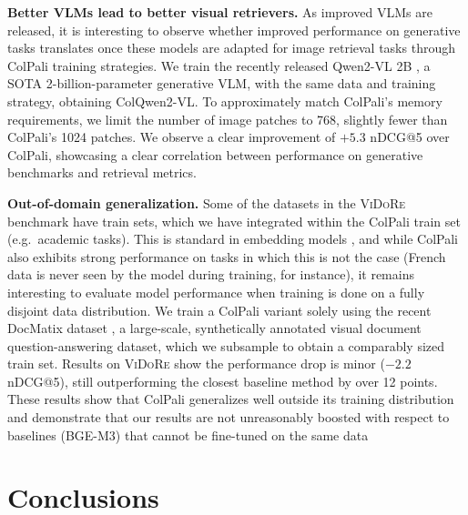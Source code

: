 \noindent\textbf{Better VLMs lead to better visual retrievers.} As improved VLMs are released, it is interesting to observe whether improved performance on generative tasks translates once these models are adapted for image retrieval tasks through ColPali training strategies. We train the recently released Qwen2-VL 2B , a SOTA 2-billion-parameter generative VLM, with the same data and training strategy, obtaining ColQwen2-VL. To approximately match ColPali's memory requirements, we limit the number of image patches to 768, slightly fewer than ColPali's 1024 patches. We observe a clear improvement of $+5.3$ nDCG@5 over ColPali, showcasing a clear correlation between performance on generative benchmarks and retrieval metrics.

\noindent\textbf{Out-of-domain generalization.} Some of the datasets in the \textsc{ViDoRe} benchmark have train sets, which we have integrated within the ColPali train set (e.g.\ academic tasks). This is standard in embedding models , and while ColPali also exhibits strong performance on tasks in which this is not the case (French data is never seen by the model during training, for instance), it remains interesting to evaluate model performance when training is done on a fully disjoint data distribution. We train a ColPali variant solely using the recent DocMatix dataset , a large-scale, synthetically annotated visual document question-answering dataset, which we subsample to obtain a comparably sized train set. Results on \textsc{ViDoRe} show the performance drop is minor ($-2.2$ nDCG@5), still outperforming the closest baseline method by over 12 points. These results show that ColPali generalizes well outside its training distribution and demonstrate that our results are not unreasonably boosted with respect to baselines (BGE-M3) that cannot be fine-tuned on the same data

\section{Conclusions}
\label{section:colpali:conclusions_and_future_work}

